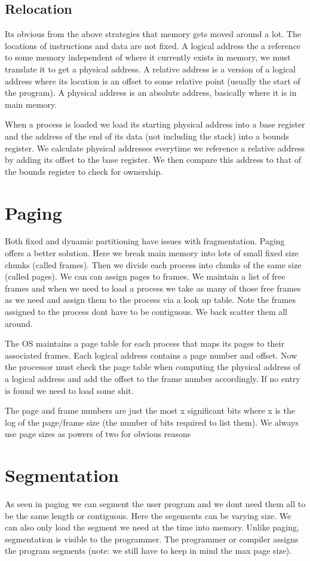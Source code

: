\documentclass[12pt]{article}
\begin{document}
\subsection{Relocation}
Its  obvious from the above strategies that memory gets moved around a lot. The locations of instructions and data are not fixed. A logical address the a reference to some memory independent of where it currently exists in memory, we must translate it to get a physical address. A relative address is a version of a logical address where its location is an offset to some relative point (usually the start of the program). A physical address is an absolute address, basically where it is in main memory.

When a process is loaded we load its starting physical address into a base register and the address of the end of its data (not including the stack) into a bounds register. We calculate physical addresses everytime we reference a relative address by adding its offset to the base register. We then compare this address to that of the bounds register to check for ownership.

\section{Paging}
Both fixed and dynamic partitioning have issues with fragmentation. Paging offers a better solution. Here we break main memory into lots of small fixed size chunks (called frames). Then we divide each process into chunks of the same size (called pages). We can can assign pages to frames. We maintain a list of free frames and when we need to load a process we take as many of those free frames as we need and assign them to the process via a look up table. Note the frames assigned to the process dont have to be contiguous. We back scatter them all around.

The OS maintains a page table for each process that maps its pages to their associated frames. Each logical address contains a page number and offset. Now the processor must check the page table when computing the physical address of a logical address and add the offset to the frame number accordingly. If no entry is found we need to load some shit.

The page and frame numbers are just the most x significant bits where x is the log of the page/frame size (the number of bits required to list them). We always use page sizes as powers of two for obvious reasons

\section{Segmentation}
As seen in paging we can segment the user program and we dont need them all to be the same length or contiguous. Here the segements can be varying size. We can also only load the segment we need at the time into memory. Unlike paging, segmentation is visible to the programmer. The programmer or compiler assigns the program segments (note: we still have to keep in mind the max page size).
\end{document}
